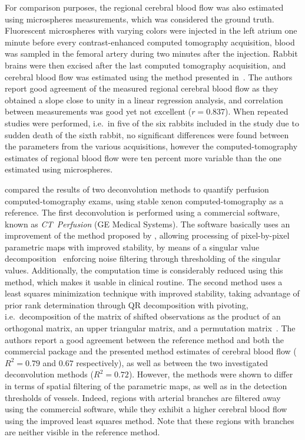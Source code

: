 For comparison purposes, the regional cerebral blood flow was also estimated using microspheres measurements, which was considered the ground truth.
Fluorescent microspheres with varying colors were injected in the left atrium one minute before every contrast-enhanced computed tomography acquisition, blood was sampled in the femoral artery during two minutes after the injection. 
Rabbit brains were then excised after the last computed tomography acquisition, and cerebral blood flow was estimated using the method presented in~\cite{Heymann:1977hj}.
The authors report good agreement of the measured regional cerebral blood flow as they obtained a slope close to unity in a linear regression analysis, and correlation between measurements was good yet not excellent ($r = 0.837$).
When repeated studies were performed, i.e.~in five of the six rabbits included in the study due to sudden death of the sixth rabbit, no significant differences were found between the parameters from the various acquisitions, however the computed-tomography estimates of regional blood flow were ten percent more variable than the one estimated using microspheres.

\citet{Wintermark:2001bm} compared the results of two deconvolution methods to quantify perfusion computed-tomography exams, using stable xenon computed-tomography as a reference.
The first deconvolution is performed using a commercial software, known as \emph{CT~Perfusion} (GE Medical Systems).
The software basically uses an improvement of the method proposed by \citet{Cenic:1999un}, allowing processing of pixel-by-pixel parametric maps with improved stability, by means of a singular value decomposition~\cite{Golub:2006bj} enforcing noise filtering through thresholding of the singular values. 
Additionally, the computation time is considerably reduced using this method, which makes it usable in clinical routine.
The second method uses a least squares minimization technique with improved stability, taking advantage of prior rank determination through QR decomposition with pivoting, i.e.~decomposition of the matrix of shifted observations as the product of an orthogonal matrix, an upper triangular matrix, and a permutation matrix~\cite{Golub:100136}.
The authors report a good agreement between the reference method and both the commercial package and the presented method estimates of cerebral blood flow ($R^2 = 0.79$ and $0.67$ respectively), as well as between the two investigated deconvolution methods ($R^2 = 0.72$).
However, the methods were shown to differ in terms of spatial filtering of the parametric maps, as well as in the detection thresholds of vessels.
Indeed, regions with arterial branches are filtered away using the commercial software, while they exhibit a higher cerebral blood flow using the improved least squares method.
Note that these regions with branches are neither visible in the reference method.

